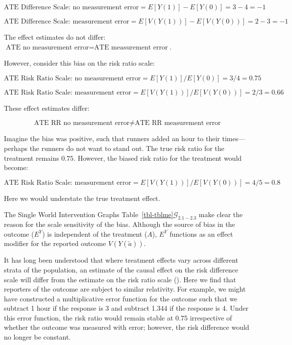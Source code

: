 \documentclass[
  single column]{article}
\begin{document}
\[
\text{ATE Difference Scale: no measurement error} = E[Y(1)] - E[Y(0)] = 3 - 4 = -1
\]

\[
\text{ATE Difference Scale: measurement error} = E[V(Y(1))] - E[V(Y(0))] = 2 - 3 = -1
\]

The effect estimates do not differ:
\(\text{ATE no measurement error} = \text{ATE measurement error}\).

However, consider this bias on the risk ratio scale:

\[
\text{ATE Risk Ratio Scale: no measurement error} = E[Y(1)] / E[Y(0)] = 3 / 4 = 0.75
\]

\[
\text{ATE Risk Ratio Scale: measurement error} = E[V(Y(1))] / E[V(Y(0))] = 2 / 3 = 0.66
\]

These effect estimates differ:

\[\text{ATE RR no measurement error} \neq \text{ATE RR measurement error}\]

Imagine the bias was positive, such that runners added an hour to their
times---perhaps the runners do not want to stand out. The true risk
ratio for the treatment remains \(0.75\). However, the biased risk ratio
for the treatment would become:

\[
\text{ATE Risk Ratio Scale: measurement error} = E[V(Y(1))] / E[V(Y(0))] = 4 / 5 = 0.8
\]

Here we would understate the true treatment effect.

The Single World Intervention Graphs
Table~\ref{tbl-tblme}\(\mathcal{G}_{2.1-2.3}\) make clear the reason for
the scale sensitivity of the bias. Although the source of bias in the
outcome (\(E^Y\)) is independent of the treatment (\(A\)), \(E^Y\)
functions as an effect modifier for the reported outcome
\(V(Y(\tilde{a}))\).

It has long been understood that where treatment effects vary across
different strata of the population, an estimate of the causal effect on
the risk difference scale will differ from the estimate on the risk
ratio scale ().
Here we find that reporters of the outcome are subject to similar
relativity. For example, we might have constructed a multiplicative
error function for the outcome such that we subtract 1 hour if the
response is 3 and subtract 1.344 if the response is 4. Under this error
function, the risk ratio would remain stable at 0.75 irrespective of
whether the outcome was measured with error; however, the risk
difference would no longer be constant.
\end{document}
